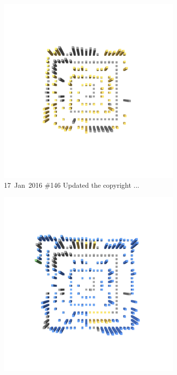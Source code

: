 \begin{figure}[ht]
\begin{subfigure}{0.32\textwidth}
        \includegraphics[width=\linewidth]{JetUML_V0S7.png}
        \caption{\mbox{17 Jan 2016} \hfill \linebreak  \#146 Updated the copyright ...}
         \label{fig:JetUML_V0S7}
    \end{subfigure}
    \hspace*{\fill}
    \begin{subfigure}{0.32\textwidth}
        \includegraphics[width=\linewidth]{JetUML_V0S8.png}

\end{subfigure}
\end{figure}
